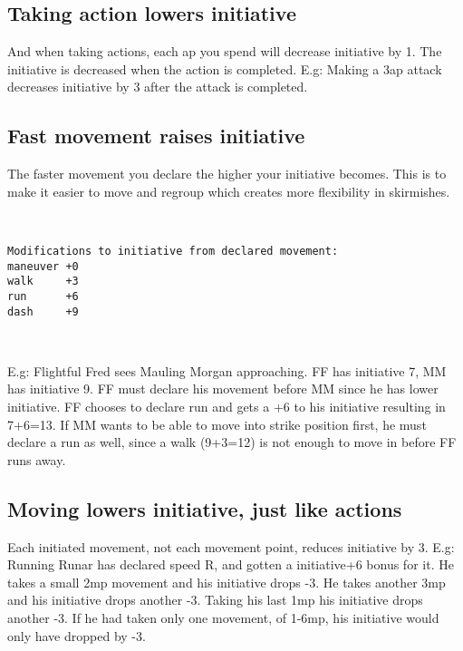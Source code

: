 \subsection*{Taking action lowers initiative}
And when taking actions, each ap you spend will decrease initiative by 1. The initiative is decreased when the action is completed.
E.g: Making a 3ap attack decreases initiative by 3 after the attack is completed.


\subsection*{Fast movement raises initiative}
The faster movement you declare the higher your initiative becomes. This is to make it easier to move and regroup which creates more flexibility in skirmishes.

\

\begin{verbatim}
Modifications to initiative from declared movement:
maneuver +0
walk     +3
run      +6
dash     +9
\end{verbatim}

\

E.g: Flightful Fred sees Mauling Morgan approaching. FF has initiative 7, MM has initiative 9. FF must declare his movement before MM since he has lower initiative. FF chooses to declare run and gets a +6 to his initiative resulting in 7+6=13. If MM wants to be able to move into strike position first, he must declare a run as well, since a walk (9+3=12) is not enough to move in before FF runs away.


\subsection*{Moving lowers initiative, just like actions}
\label{sec:movinglowersinitiative}
Each initiated movement, not each movement point, reduces initiative by 3. E.g: Running Runar has declared speed R, and gotten a initiative+6 bonus for it. He takes a small 2mp movement and his initiative drops -3. He takes another 3mp and his initiative drops another -3. Taking his last 1mp his initiative drops another -3. If he had taken only one movement, of 1-6mp, his initiative would only have dropped by -3.



